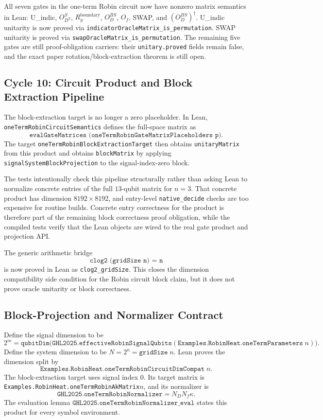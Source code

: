 All seven gates in the one-term Robin circuit now have nonzero matrix
semantics in Lean: U\_indic, \(O_{D^T}^S\), \(R_y^{\text{boundary}}\),
\(O_D^{BS}\), \(O_f\), SWAP, and \((O_D^{BS})^\dagger\).
U\_indic unitarity is now proved via \texttt{indicatorOracleMatrix\_is\_permutation}.
SWAP unitarity is proved via \texttt{swapOracleMatrix\_is\_permutation}.
The remaining five gates are still proof-obligation carriers:
their \texttt{unitary.proved} fields remain false, and the exact paper
rotation/block-extraction theorem is still open.

\subsection{Cycle 10: Circuit Product and Block Extraction Pipeline}

The block-extraction target is no longer a zero placeholder.  In Lean,
\texttt{oneTermRobinCircuitSemantics} defines the full-space matrix as
\[
  \texttt{evalGateMatrices (oneTermRobinGateMatrixPlaceholders p)}.
\]
The target \texttt{oneTermRobinBlockExtractionTarget} then obtains
\texttt{unitaryMatrix} from this product and obtains \texttt{blockMatrix}
by applying \texttt{signalSystemBlockProjection} to the signal-index-zero
block.

The tests intentionally check this pipeline structurally rather than asking
Lean to normalize concrete entries of the full \(13\)-qubit matrix for \(n=3\).
That concrete product has dimension \(8192 \times 8192\), and entry-level
\texttt{native\_decide} checks are too expensive for routine builds.  Concrete
entry correctness for the product is therefore part of the remaining block
correctness proof obligation, while the compiled tests verify that the Lean
objects are wired to the real gate product and projection API.

The generic arithmetic bridge
\[
  \texttt{clog2 (gridSize n) = n}
\]
is now proved in Lean as \texttt{clog2\_gridSize}.  This closes the dimension
compatibility side condition for the Robin circuit block claim, but it does not
prove oracle unitarity or block correctness.

\subsection{Block-Projection and Normalizer Contract}

Define the signal dimension to be
\[
  2^{m}
  =
  \texttt{qubitDim}
  \bigl(\texttt{GHL2025.effectiveRobinSignalQubits}
  (\texttt{Examples.RobinHeat.oneTermParameters}\;n)\bigr).
\]
Define the system dimension to be \(N=2^n=\texttt{gridSize}\;n\).  Lean proves
the dimension split by
\[
  \texttt{Examples.RobinHeat.oneTermRobinCircuitDimCompat}\;n.
\]
The block-extraction target uses signal index \(0\).  Its target matrix is
\texttt{Examples.RobinHeat.oneTermRobinAkMatrix}\(n\), and its normalizer is
\[
  \texttt{GHL2025.oneTermRobinNormalizer}
  =
  N_D N_f \kappa.
\]
The evaluation lemma
\(\texttt{GHL2025.oneTermRobinNormalizer\_eval}\) states this product for every
symbol environment.

